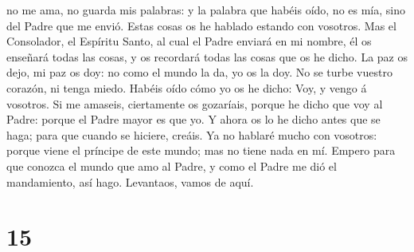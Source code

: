 no me ama, no guarda mis palabras: y la palabra que habéis oído, no es
mía, sino del Padre que me envió.  Estas cosas os he
hablado estando con vosotros.  Mas el Consolador, el
Espíritu Santo, al cual el Padre enviará en mi nombre, él os enseñará
todas las cosas, y os recordará todas las cosas que os he dicho.
 La paz os dejo, mi paz os doy: no como el mundo la da, yo
os la doy. No se turbe vuestro corazón, ni tenga miedo. 
Habéis oído cómo yo os he dicho: Voy, y vengo á vosotros. Si me amaseis,
ciertamente os gozaríais, porque he dicho que voy al Padre: porque el
Padre mayor es que yo.  Y ahora os lo he dicho antes que se
haga; para que cuando se hiciere, creáis.  Ya no hablaré
mucho con vosotros: porque viene el príncipe de este mundo; mas no tiene
nada en mí.  Empero para que conozca el mundo que amo al
Padre, y como el Padre me dió el mandamiento, así hago. Levantaos, vamos
de aquí.

\hypertarget{section-14}{%
\section{15}\label{section-14}}


